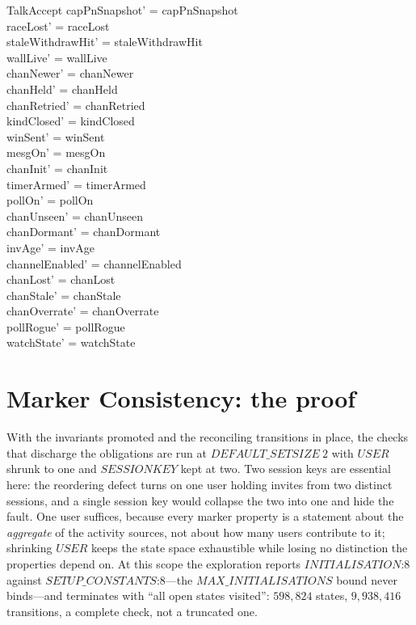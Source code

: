 \documentclass[a4paper,10pt,fleqn]{article}
\begin{document}
\begin{schema}{TalkAccept}
  capPnSnapshot' = capPnSnapshot \\
  raceLost' = raceLost \\
  staleWithdrawHit' = staleWithdrawHit \\
  wallLive' = wallLive \\
  chanNewer' = chanNewer \\
  chanHeld' = chanHeld \\
  chanRetried' = chanRetried \\
  kindClosed' = kindClosed \\
  winSent' = winSent \\
  mesgOn' = mesgOn \\
  chanInit' = chanInit \\
  timerArmed' = timerArmed \\
  pollOn' = pollOn \\
  chanUnseen' = chanUnseen \\
  chanDormant' = chanDormant \\
  invAge' = invAge \\
  channelEnabled' = channelEnabled \\
  chanLost' = chanLost \\
  chanStale' = chanStale \\
  chanOverrate' = chanOverrate \\
  pollRogue' = pollRogue \\
  watchState' = watchState
\end{schema}

\section{Marker Consistency: the proof}
\label{sec:markerfix2}

With the invariants promoted and the reconciling transitions in place, the
checks that discharge the obligations are run at $DEFAULT\_SETSIZE~2$ with
$USER$ shrunk to one and $SESSIONKEY$ kept at two.  Two session keys are
essential here: the reordering defect turns on one user holding invites from
two distinct sessions, and a single session key would collapse the two into
one and hide the fault.  One user suffices, because every marker property is
a statement about the \emph{aggregate} of the activity sources, not about how
many users contribute to it; shrinking $USER$ keeps the state space
exhaustible while losing no distinction the properties depend on.  At this
scope the exploration reports $INITIALISATION$:$8$ against
$SETUP\_CONSTANTS$:$8$---the $MAX\_INITIALISATIONS$ bound never binds---and
terminates with ``all open states visited'': $598{,}824$ states,
$9{,}938{,}416$ transitions, a complete check, not a truncated one.
\end{document}
